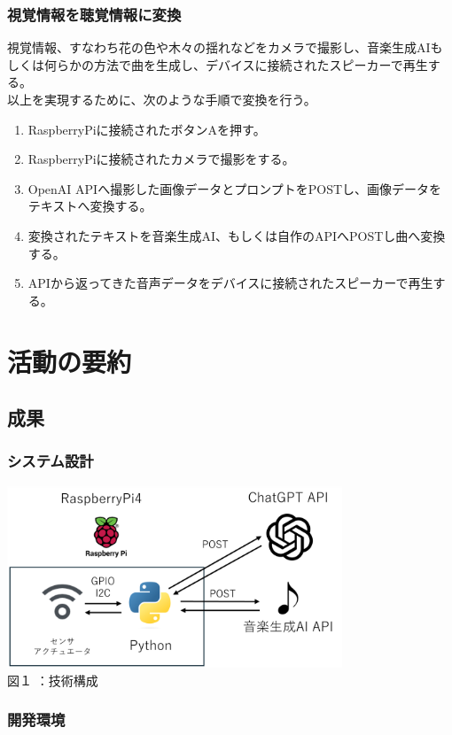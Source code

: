 \documentclass[12pt,a4paper]{report}
\begin{document}
\newpage

\subsection{視覚情報を聴覚情報に変換}
\noindent\space
視覚情報、すなわち花の色や木々の揺れなどをカメラで撮影し、音楽生成AIもしくは何らかの方法で曲を生成し、デバイスに接続されたスピーカーで再生する。\\
以上を実現するために、次のような手順で変換を行う。
\begin{enumerate}
  \item RaspberryPiに接続されたボタンAを押す。
  \item RaspberryPiに接続されたカメラで撮影をする。
  \item OpenAI APIへ撮影した画像データとプロンプトをPOSTし、画像データをテキストへ変換する。
  \item 変換されたテキストを音楽生成AI、もしくは自作のAPIへPOSTし曲へ変換する。
  \item APIから返ってきた音声データをデバイスに接続されたスピーカーで再生する。
\end{enumerate} 

\chapter{活動の要約}
\section{成果}
\noindent\space
\subsection{システム設計}
\begin{center}
  \includegraphics[width=100mm]{images/tech-conf.png}\\
  図１  ：技術構成
\end{center}

\subsection{開発環境}
\noindent\space
\end{document}
